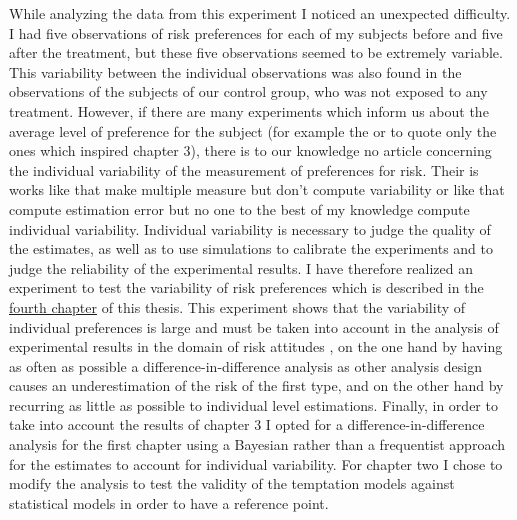 \documentclass[
]{book}
\begin{document}
While analyzing the data from this experiment I noticed an unexpected
difficulty.
I had five observations of risk preferences for each of my subjects before and
five after the treatment, but these five observations seemed to be extremely variable.
This variability between the individual observations was also found in the
observations of the subjects of our control group, who was not exposed to any treatment.
However, if there are many experiments which inform us about the average level
of preference for the subject (for example the \citet{lejuez2002evaluation} or
\citet{crosetto2013bomb} to quote only the ones which inspired chapter 3), there is to
our knowledge no article concerning the individual variability of the
measurement of preferences for risk.
Their is works like \citet{ert2017revisiting} that make multiple measure but don't
compute variability or like \citet{wilcox2007predicting} that compute estimation
error but no one to the best of my knowledge compute individual variability.
Individual variability is necessary to judge the quality of the estimates, as
well as to use simulations to calibrate the experiments and to judge the
reliability of the experimental results.
I have therefore realized an experiment to test the variability of risk
preferences which is described in the \protect\hyperlink{multi-choice}{fourth chapter} of this thesis.
This experiment shows that the variability of individual preferences is
large and must be taken into account in the analysis of experimental
results in the domain of risk attitudes
, on the one hand by having as often as possible a
difference-in-difference analysis as other analysis design causes an
underestimation of the risk of the first type, and on the other hand by
recurring as little as possible to individual level estimations.
Finally, in order to take into account the results of chapter 3 I opted for a
difference-in-difference analysis for the first chapter using a Bayesian rather
than a frequentist approach for the estimates to account for individual
variability.
For chapter two I chose to modify the analysis to test the validity of the
temptation models against statistical models in order to have a reference point.
\end{document}
